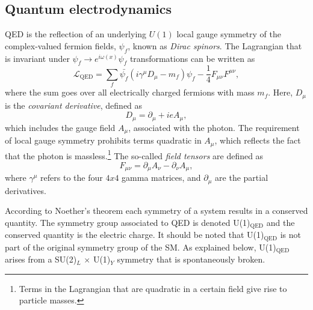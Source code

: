 \subsection{Quantum electrodynamics}

QED is the reflection of an underlying $U(1)$ local gauge symmetry of the complex-valued fermion fields, $\psi_f$, known as \emph{Dirac spinors}.
The Lagrangian that is invariant under $\psi_f \rightarrow e^{i \omega(x)} \psi_f$ transformations can be written as
\begin{equation}
  \mathcal{L}_{\text{QED}} = \sum_f \bar{\psi_f}(i\gamma^\mu D_\mu - m_f)\psi_f - \frac{1}{4}F_{\mu\nu}F^{\mu\nu},
  \label{eq:Lagrangianqed}
\end{equation}
where the sum goes over all electrically charged fermions with mass $m_f$. 
Here, $D_\mu$ is the \emph{covariant derivative}, defined as
\begin{equation}
  D_\mu = \partial_\mu + ieA_\mu,  
\end{equation}
which includes the gauge field $A_\mu$, associated with the photon. The requirement of local gauge symmetry prohibits terms quadratic in $A_\mu$, which reflects the fact that the photon is massless.\footnote{Terms in the Lagrangian that are quadratic in a certain field give rise to particle masses.}
The so-called \emph{field tensors} are defined as 
\begin{equation}
  F_{\mu\nu} = \partial_\mu A_\nu - \partial_\nu A_\mu, 
\end{equation}
where $\gamma^\mu$ refers to the four $4x4$ gamma matrices, and $\partial_\mu$ are the partial derivatives. 

According to Noether's theorem each symmetry of a system results in a conserved quantity. 
The symmetry group associated to QED is denoted U(1)$_{\text{QED}}$ and the conserved quantity is the electric charge.
It should be noted that U(1)$_{\text{QED}}$ is not part of the original symmetry group of the SM. As explained below, U(1)$_{\text{QED}}$ arises from a SU(2)$_L$ $\times$ U(1)$_Y$ symmetry that is spontaneously broken.



